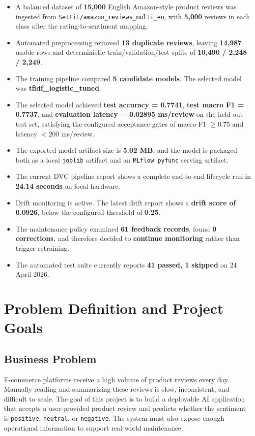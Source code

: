\documentclass[11pt,a4paper]{article}
\begin{document}
\begin{itemize}[leftmargin=1.4em]
  \item A balanced dataset of \textbf{15{,}000} English Amazon-style product reviews was ingested from \texttt{SetFit/amazon\_reviews\_multi\_en}, with \textbf{5{,}000} reviews in each class after the rating-to-sentiment mapping.
  \item Automated preprocessing removed \textbf{13 duplicate reviews}, leaving \textbf{14{,}987} usable rows and deterministic train/validation/test splits of \textbf{10{,}490 / 2{,}248 / 2{,}249}.
  \item The training pipeline compared \textbf{5 candidate models}. The selected model was \textbf{tfidf\_logistic\_tuned}.
  \item The selected model achieved \textbf{test accuracy = 0.7741}, \textbf{test macro F1 = 0.7737}, and \textbf{evaluation latency = 0.02895 ms/review} on the held-out test set, satisfying the configured acceptance gates of macro F1 $\ge 0.75$ and latency $< 200$ ms/review.
  \item The exported model artifact size is \textbf{5.02 MB}, and the model is packaged both as a local \texttt{joblib} artifact and an \texttt{MLflow pyfunc} serving artifact.
  \item The current DVC pipeline report shows a complete end-to-end lifecycle run in \textbf{24.14 seconds} on local hardware.
  \item Drift monitoring is active. The latest drift report shows a \textbf{drift score of 0.0926}, below the configured threshold of \textbf{0.25}.
  \item The maintenance policy examined \textbf{61 feedback records}, found \textbf{0 corrections}, and therefore decided to \textbf{continue monitoring} rather than trigger retraining.
  \item The automated test suite currently reports \textbf{41 passed, 1 skipped} on 24 April 2026.
\end{itemize}

\section{Problem Definition and Project Goals}

\subsection{Business Problem}

E-commerce platforms receive a high volume of product reviews every day. Manually reading and summarizing these reviews is slow, inconsistent, and difficult to scale. The goal of this project is to build a deployable AI application that accepts a user-provided product review and predicts whether the sentiment is \texttt{positive}, \texttt{neutral}, or \texttt{negative}. The system must also expose enough operational information to support real-world maintenance.
\end{document}
